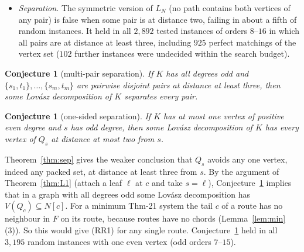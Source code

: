 \documentclass[11pt]{amsart}
\newtheorem{conjecture}[theorem]{Conjecture}
\theoremstyle{definition}
\begin{document}
\begin{itemize}
non-adjacent pairs (orders $\le10$). The stronger statement that $Q_c\subseteq N[c]$ can be achieved
had no failure at $19{,}040$ vertices (orders $\le10$), nor at $5{,}026$ further vertices of orders
$6$--$12$ ($41$ more were undecided). No failure of
$L_N$ in $3{,}597$ decided instances of orders up to $14$ with up to seven pairs ($135$ more were
undecided). When the pairs form a perfect matching $N$ of $V(F)$ (the Eulerian case: $F+N$ has all
degrees even), no failure in $2{,}332$ decided
instances of orders $8$--$20$ ($157$ more were undecided within the search budget). In $2{,}421$ of the
$2{,}489$ instances some pair is at distance two, where the symmetric version below fails. On random $4$-regular graphs of orders $14$--$20$ and $6$-regular graphs of orders $14$--$18$, each with a random perfect matching and orientation, there was no failure in $600$ instances, all decided.
\item \emph{Separation.} The symmetric version of $L_N$ (no path contains both vertices of any pair) is
false when some pair is at distance two, failing in about a fifth of random instances. It held in all
$2{,}892$ tested instances of orders $8$--$16$ in which all pairs are at distance at least three,
including $925$ perfect matchings of the vertex set ($102$ further instances were undecided within the
search budget).
\end{itemize}

\begin{conjecture}[multi-pair separation]\label{conj:msep}
If $K$ has all degrees odd and $\{s_1,t_1\},\dots,\{s_m,t_m\}$ are pairwise disjoint pairs at distance at
least three, then some Lov\'asz decomposition of $K$ separates every pair.
\end{conjecture}

\begin{conjecture}[one-sided separation]\label{conj:ball}
If $K$ has at most one vertex of positive even degree and $s$ has odd degree, then some Lov\'asz
decomposition of $K$ has every vertex of $Q_s$ at distance at most two from $s$.
\end{conjecture}

Theorem~\ref{thm:sep} gives the weaker conclusion that $Q_s$ avoids any one vertex, indeed any packed
set, at distance at least three from $s$. By the argument of Theorem~\ref{thm:L1} (attach a leaf
$\ell$ at $c$ and take $s=\ell$), Conjecture~\ref{conj:ball} implies that in a graph with all degrees
odd some Lov\'asz decomposition has $V(Q_c)\subseteq N[c]$. For a minimum Thm-21 system the tail $c$ of
a route has no neighbour in $F$ on its route, because routes have no chords
(Lemma~\ref{lem:min}(3)). So this would give (RR1) for any single route. Conjecture~\ref{conj:ball}
held in all $3{,}195$ random instances with one even vertex (odd orders $7$--$15$).
\end{document}
